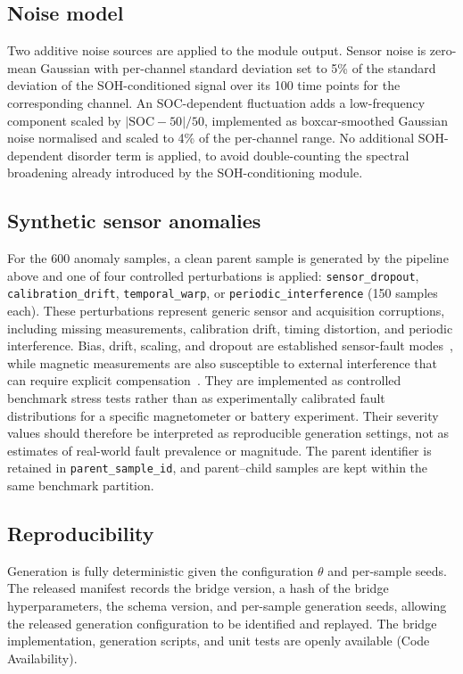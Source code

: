 \documentclass[11pt]{article}
\begin{document}
\subsection*{Noise model}

Two additive noise sources are applied to the module output. Sensor noise is zero-mean Gaussian with per-channel standard deviation set to 5\% of the standard deviation of the SOH-conditioned signal over its 100 time points for the corresponding channel. An SOC-dependent fluctuation adds a low-frequency component scaled by $|\mathrm{SOC}-50|/50$, implemented as boxcar-smoothed Gaussian noise normalised and scaled to 4\% of the per-channel range. No additional SOH-dependent disorder term is applied, to avoid double-counting the spectral broadening already introduced by the SOH-conditioning module.

\subsection*{Synthetic sensor anomalies}

For the 600 anomaly samples, a clean parent sample is generated by the
pipeline above and one of four controlled perturbations is applied:
\texttt{sensor\_dropout}, \texttt{calibration\_drift},
\texttt{temporal\_warp}, or \texttt{periodic\_interference}
(150 samples each). These perturbations represent generic sensor and acquisition corruptions,
including missing measurements, calibration drift, timing distortion, and
periodic interference. Bias, drift, scaling, and dropout are established
sensor-fault modes~\cite{silva2012sensorfault}, while magnetic measurements
are also susceptible to external interference that can require explicit
compensation~\cite{janosek2019magnetic}. They are implemented as controlled
benchmark stress tests rather than as experimentally calibrated fault
distributions for a specific magnetometer or battery experiment. Their
severity values should therefore be interpreted as reproducible generation
settings, not as estimates of real-world fault prevalence or magnitude.
The parent identifier is retained in \texttt{parent\_sample\_id}, and
parent--child samples are kept within the same benchmark partition.

\subsection*{Reproducibility}

Generation is fully deterministic given the configuration $\theta$ and
per-sample seeds. The released manifest records the bridge version, a hash
of the bridge hyperparameters, the schema version, and per-sample generation
seeds, allowing the released generation configuration to be identified and
replayed. The bridge implementation, generation scripts, and unit tests are
openly available (Code Availability).
\end{document}

